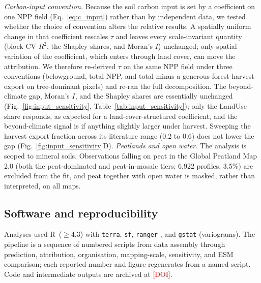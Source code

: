 \documentclass[12pt, a4paper]{article}
\newcommand{\PH}[1]{\textcolor{red}{#1}}
\begin{document}
\emph{Carbon-input convention.} Because the soil carbon input is set by a
coefficient on one NPP field (Eq.~\ref{eq:c_input}) rather than by independent
data, we tested whether the choice of convention alters the relative results. A
spatially uniform change in that coefficient rescales $\tau$ and leaves every
scale-invariant quantity (block-CV $R^2$, the Shapley shares, and Moran's $I$)
unchanged; only spatial variation of the coefficient, which enters through land
cover, can move the attribution. We therefore re-derived $\tau$ on the same NPP
field under three conventions (belowground, total NPP, and total minus a generous
forest-harvest export on tree-dominant pixels) and re-ran the full decomposition.
The beyond-climate gap, Moran's $I$, and the Shapley shares are essentially
unchanged (Fig.~\ref{fig:input_sensitivity}, Table~\ref{tab:input_sensitivity});
only the LandUse share responds, as expected for a land-cover-structured
coefficient, and the beyond-climate signal is if anything slightly larger under
harvest. Sweeping the harvest export fraction across its literature range (0.2 to
0.6) does not lower the gap (Fig.~\ref{fig:input_sensitivity}D).
\emph{Peatlands and open water.} The analysis is scoped to mineral soils.
Observations falling on peat in the Global Peatland Map 2.0
\citep{GreifswaldGPM2022} (both the peat-dominated and peat-in-mosaic tiers;
6,922 profiles, 3.5\%) are excluded from the fit, and peat together with open
water is masked, rather than interpreted, on all maps.
%

\subsection{Software and reproducibility}
Analyses used R~($\geq4.3$) with \texttt{terra}, \texttt{sf}, \texttt{ranger}
\citep{Wright2017}, and \texttt{gstat} (variograms). The pipeline is a sequence of
numbered scripts from data assembly through prediction, attribution, organisation,
mapping-scale, sensitivity, and ESM comparison; each reported number and figure
regenerates from a named script. Code and intermediate outputs are archived at
\PH{[DOI]}.
\end{document}

